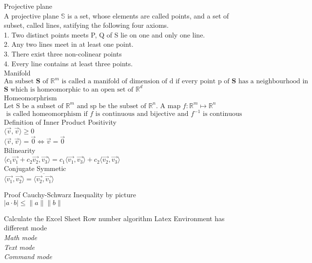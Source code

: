 \documentclass[10pt]{article}
\begin{document}
Projective plane\\
A projective plane $\mathbb{S}$ is a set, whose elements are called points, and a set of subset, called lines, satifying the following four axioms.\\
1. Two distinct points meets P, Q of S lie on one and only one line.\\ 
2. Any two lines meet in at least one point.\\
3. There exist three non-colinear points\\
4. Every line contains at least three points.\\

\noindent
Manifold\\
$\text{An subset }\mathbf{S} \text{ of } \mathbb{R}^{m} \text{ is called a manifold of dimension of d if every point p of }\mathbf{S} \text{ has a neighbourhood in }$
$\mathbf{S}\text{ which is homeomorphic to an open set of }\mathbb{R}^{d}$\\

\noindent
Homeomorphrism\\
$\text{Let S be a subset of }\mathbb{R}^{m} \text{ and sp be the subset of }\mathbb{R}^{n}. \text{ A map } \mathit{f}: \mathbb{R}^{m} \mapsto \mathbb{R}^{n}$\\
$\text{ is called homeomorphism if }\mathit{f} \text{ is continuous and bijective and }\mathit{f}^{-1} \text{ is continuous}$\\

\noindent
Definition of Inner Product
\noindent
Positivity\\
$\langle\vec{v}, \vec{v}\rangle \geq 0$\\
$\langle \vec{v} , \vec{v} \rangle = \vec{0} \iff \vec{v} = \vec{0}$\\

\noindent
Bilinearity\\
$\langle c_{1}\vec{v_1} + c_{2}\vec{v_2}, \vec{v_3}\rangle = c_{1}\langle \vec{v_1}, \vec{v_3}\rangle + c_{2}\langle\vec{v_2}, \vec{v_3} \rangle$\\

\noindent
Conjugate Symmetic\\
$\langle \vec{v_1}, \vec{v_2} \rangle = \overline{\langle \vec{v_2}, \vec{v_1} \rangle}$


\noindent
Proof  Cauchy-Schwarz Inequality by picture\\
$\vert a \cdot b \vert \leq \lVert a \lVert \lVert b \lVert$


\pagebreak
Calculate the Excel Sheet Row number algorithm
Latex Environment has different mode\\
{\it Math mode}\\
{\it Text mode}\\
{\it Command mode}\\
\end{document}
